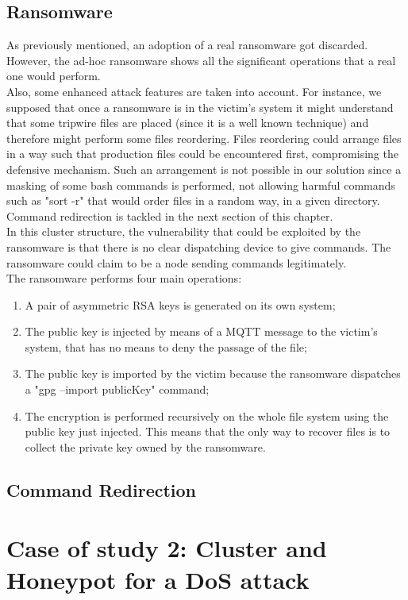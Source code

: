 \subsection{Ransomware}

As previously mentioned, an adoption of a real ransomware got discarded. However, the ad-hoc ransomware shows all the significant operations that a real one would perform.\\
Also, some enhanced attack features are taken into account. For instance, we supposed that once a ransomware is in the victim's system it might understand that some tripwire files are placed (since it is a well known technique) and therefore might perform some files reordering. Files reordering could arrange files in a way such that production files could be encountered first, compromising the defensive mechanism. Such an arrangement is not possible in our solution since a masking of some bash commands is performed, not allowing harmful commands such as "sort -r" that would order files in a random way, in a given directory. Command redirection is tackled in the next section of this chapter.\\
In this cluster structure, the vulnerability that could be exploited by the ransomware is that there is no clear dispatching device to give commands. The ransomware could claim to be a node sending commands legitimately.\\
The ransomware performs four main operations:

\begin{enumerate}
  \item A pair of asymmetric RSA keys is generated on its own system;
  \item The public key is injected by means of a MQTT message to the victim's system, that has no means to deny the passage of the file;
  \item The public key is imported by the victim because the ransomware dispatches a "gpg --import publicKey" command;
  \item The encryption is performed recursively on the whole file system using the public key just injected. This means that the only way to recover files is to collect the private key owned by the ransomware.
\end{enumerate}


\subsection{Command Redirection}
\section{Case of study 2: Cluster and Honeypot for a DoS attack}

